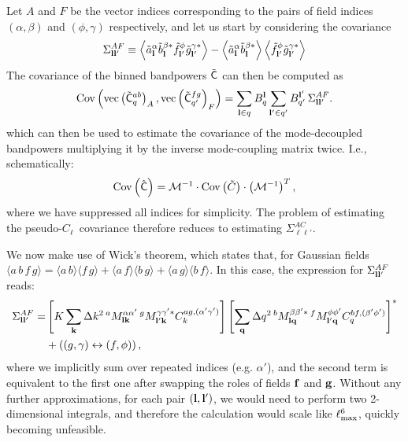 \documentclass[a4paper,11pt]{article}
\newcommand{\PCL}{pseudo-$C_\ell$~}
\newcommand{\summ}[1]{\sum_{\bf #1}\Delta #1^2}
\begin{document}
    Let $A$ and $F$ be the vector indices corresponding to the pairs of field indices $(\alpha,\beta)$ and $(\phi,\gamma)$ respectively, and let us start by considering the covariance
    \begin{equation}
      \Sigma^{AF}_{{\bf l}{\bf l}'}\equiv\left\langle\tilde{a}^\alpha_{\bf l}\tilde{b}^{\beta *}_{\bf l}\tilde{f}^\phi_{{\bf l}'}\tilde{g}^{\gamma *}_{{\bf l}'}\right\rangle-\left\langle\tilde{a}^\alpha_{\bf l}\tilde{b}^{\beta *}_{\bf l}\right\rangle\left\langle\tilde{f}^\phi_{{\bf l}'}\tilde{g}^{\gamma *}_{{\bf l}'}\right\rangle
    \end{equation}
    The covariance of the binned bandpowers $\tilde{\sf C}$ can then be computed as
    \begin{equation}\nonumber
      {\rm Cov}\left({\rm vec}\left(\tilde{\sf C}^{ab}_q\right)_A,{\rm vec}\left(\tilde{\sf C}^{fg}_{q'}\right)_F\right)=\sum_{{\bf l}\in q} B^{\bf l}_q\sum_{{\bf l}'\in q'} B^{{\bf l}'}_{q'}\,\Sigma^{AF}_{{\bf l}{\bf l}'}.
    \end{equation}
    which can then be used to estimate the covariance of the mode-decoupled bandpowers multiplying it by the inverse mode-coupling matrix twice. I.e., schematically:
    \begin{equation}
      {\rm Cov}\left(\hat{\sf C}\right)=\mathcal{M}^{-1}\cdot{\rm Cov}\left(\tilde{C}\right)\cdot\left(\mathcal{M}^{-1}\right)^{T},
    \end{equation}
    where we have suppressed all indices for simplicity. The problem of estimating the \PCL covariance therefore reduces to estimating $\Sigma^{AC}_{\ell\ell'}$.
    
    We now make use of Wick's theorem, which states that, for Gaussian fields $\langle a\,b\,f\,g\rangle=\langle a\,b\rangle\langle f\,g\rangle+\langle a\,f\rangle\langle b\,g\rangle+\langle a\,g\rangle\langle b\,f\rangle$. In this case, the expression for $\Sigma^{AF}_{{\bf l}{\bf l'}}$ reads:
    \begin{align}\nonumber
      \Sigma^{AF}_{{\bf l}{\bf l}'}=&\left[K\summ{k}\,^aM^{\alpha\alpha'}_{{\bf l}{\bf k}}\,^gM^{\gamma\gamma'*}_{{\bf l}'{\bf k}}C^{ag,(\alpha'\gamma')}_k\right]\left[\summ{q}\,^bM^{\beta\beta'*}_{{\bf l}{\bf q}}\,^fM^{\phi\phi'}_{{\bf l}'{\bf q}}C^{bf,(\beta'\phi')}_q\right]^*\\
      &+\left((g,\gamma)\leftrightarrow(f,\phi)\right),
    \end{align}
    where we implicitly sum over repeated indices (e.g. $\alpha'$), and the second term is equivalent to the first one after swapping the roles of fields ${\bf f}$ and ${\bf g}$. Without any further approximations, for each pair $({\bf l},{\bf l}')$, we would need to perform two 2-dimensional integrals, and therefore the calculation would scale like $\ell_{\rm max}^6$, quickly becoming unfeasible.
    
\end{document}
